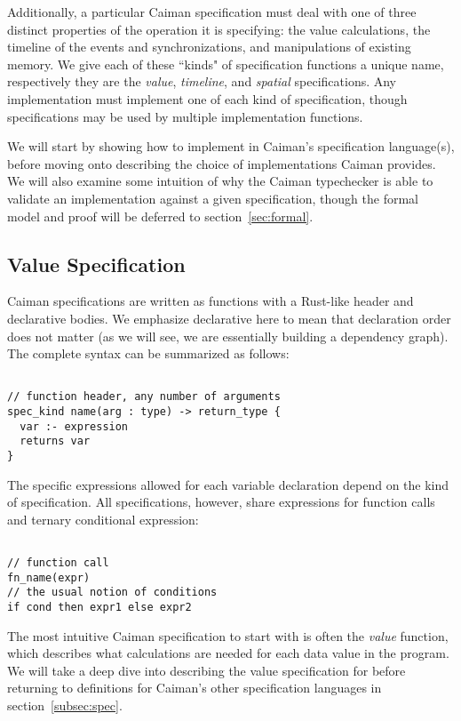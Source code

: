 Additionally, a particular Caiman specification must deal with one of three distinct properties of the operation it is specifying: the value calculations, the timeline of the events and synchronizations, and manipulations of existing memory.  We give each of these ``kinds" of specification functions a unique name, respectively they are the \textit{value}, \textit{timeline}, and \textit{spatial} specifications.  Any implementation must implement one of each kind of specification, though specifications may be used by multiple implementation functions.

We will start by showing how to implement  in Caiman's specification language(s), before moving onto describing the choice of implementations Caiman provides.  We will also examine some intuition of why the Caiman typechecker is able to validate an implementation against a given specification, though the formal model and proof will be deferred to section~\ref{sec:formal}.

\subsection{Value Specification}
\label{subsec:value}

Caiman specifications are written as functions with a Rust-like header and declarative bodies.  We emphasize declarative here to mean that declaration order does not matter (as we will see, we are essentially building a dependency graph).  The complete syntax can be summarized as follows:
%
\begin{lstlisting}

// function header, any number of arguments
spec_kind name(arg : type) -> return_type {
  var :- expression
  returns var
}
\end{lstlisting}
%
The specific expressions allowed for each variable declaration depend on the kind of specification.  All specifications, however, share expressions for function calls and ternary conditional expression:
%
\begin{lstlisting}

// function call
fn_name(expr)
// the usual notion of conditions
if cond then expr1 else expr2
\end{lstlisting}
%
The most intuitive Caiman specification to start with is often the \textit{value} function, which describes what calculations are needed for each data value in the program.  We will take a deep dive into describing the value specification for  before returning to definitions for Caiman's other specification languages in section~\ref{subsec:spec}.  

